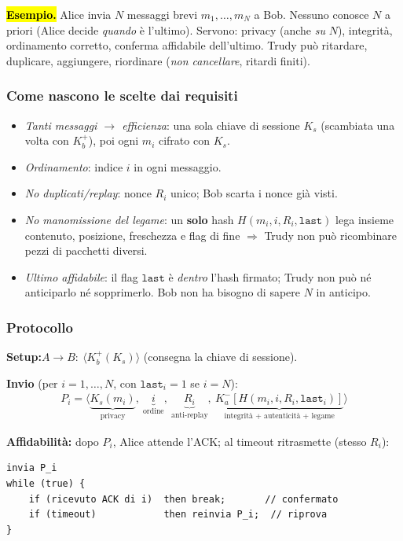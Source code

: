\documentclass[11pt,a4paper]{report}
\begin{document}
\hl{\textbf{Esempio.}} Alice invia $N$ messaggi brevi $m_1,\dots,m_N$ a Bob.
Nessuno conosce $N$ a priori (Alice decide \emph{quando} è l'ultimo). Servono:
privacy (anche \emph{su} $N$), integrità, ordinamento corretto, conferma
affidabile dell'ultimo. Trudy può ritardare, duplicare, aggiungere, riordinare
(\emph{non cancellare}, ritardi finiti).

\subsubsection*{Come nascono le scelte dai requisiti}
\begin{itemize}[noitemsep]
\item \emph{Tanti messaggi $\to$ efficienza}: una sola chiave di sessione $K_s$
(scambiata una volta con $K_b^+$), poi ogni $m_i$ cifrato con $K_s$.
\item \emph{Ordinamento}: indice $i$ in ogni messaggio.
\item \emph{No duplicati/replay}: nonce $R_i$ unico; Bob scarta i nonce già visti.
\item \emph{No manomissione del legame}: un \textbf{solo} hash
$H(m_i, i, R_i, \texttt{last})$ lega insieme contenuto, posizione, freschezza e
flag di fine $\Rightarrow$ Trudy non può ricombinare pezzi di pacchetti diversi.
\item \emph{Ultimo affidabile}: il flag $\texttt{last}$ è \emph{dentro} l'hash
firmato; Trudy non può né anticiparlo né sopprimerlo. Bob non ha bisogno di sapere
$N$ in anticipo.
\end{itemize}

\subsubsection*{Protocollo}
\noindent\textbf{Setup:}\quad $A \to B:\ \langle K_b^+(K_s) \rangle$ \quad (consegna
la chiave di sessione).

\noindent\textbf{Invio} (per $i = 1,\dots,N$, con $\texttt{last}_i=1$ se $i=N$):
\begin{align*}
  P_i = \Big\langle \underbrace{K_s(m_i)}_\text{privacy},\ \underbrace{i}_\text{ordine},\ \underbrace{R_i}_\text{anti-replay},\ \underbrace{K_a^-[H(m_i, i, R_i, \texttt{last}_i)]}_\text{integrità + autenticità + legame} \Big\rangle
\end{align*}

\noindent\textbf{Affidabilità:} dopo $P_i$, Alice attende l'ACK; al timeout
ritrasmette (stesso $R_i$):
\begin{verbatim}
invia P_i
while (true) {
    if (ricevuto ACK di i)  then break;       // confermato
    if (timeout)            then reinvia P_i;  // riprova
}
\end{verbatim}
\end{document}
